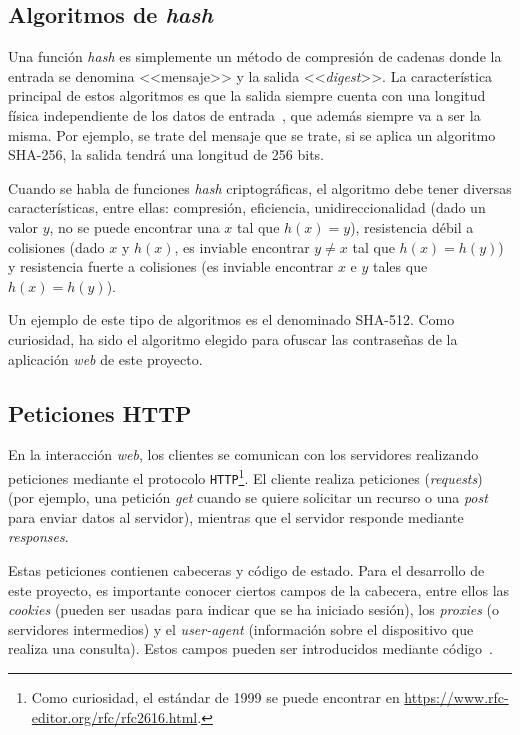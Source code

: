 \subsection{Algoritmos de \textit{hash}}

Una función \textit{hash} es simplemente un método de compresión de cadenas donde la entrada se denomina <<mensaje>> y la salida <<\textit{digest}>>. La característica principal de estos algoritmos es que la salida siempre cuenta con una longitud física independiente de los datos de entrada~\cite{apuntesCybersec}, que además siempre va a ser la misma. Por ejemplo, se trate del mensaje que se trate, si se aplica un algoritmo SHA-256, la salida tendrá una longitud de 256 bits.

Cuando se habla de funciones \textit{hash} criptográficas, el algoritmo debe tener diversas características, entre ellas: compresión, eficiencia, unidireccionalidad (dado un valor $y$, no se puede encontrar una $x$ tal que $h(x)=y$), resistencia débil a colisiones (dado $x$ y $h(x)$, es inviable encontrar $y \ne x$ tal que $h(x)=h(y)$) y resistencia fuerte a colisiones (es inviable encontrar $x$ e $y$ tales que $h(x)=h(y)$).

Un ejemplo de este tipo de algoritmos es el denominado SHA-512. Como curiosidad, ha sido el algoritmo elegido para ofuscar las contraseñas de la aplicación \textit{web} de este proyecto.

\subsection{Peticiones HTTP}

En la interacción \textit{web}, los clientes se comunican con los servidores realizando peticiones mediante el protocolo \texttt{HTTP}\footnote{Como curiosidad, el estándar de 1999 se puede encontrar en \url{https://www.rfc-editor.org/rfc/rfc2616.html}.}. El cliente realiza peticiones (\textit{requests}) (por ejemplo, una petición \textit{get} cuando se quiere solicitar un recurso o una \textit{post} para enviar datos al servidor), mientras que el servidor responde mediante \textit{responses}.

Estas peticiones contienen cabeceras y código de estado. Para el desarrollo de este proyecto, es importante conocer ciertos campos de la cabecera, entre ellos las \textit{cookies} (pueden ser usadas para indicar que se ha iniciado sesión), los \textit{proxies} (o servidores intermedios) y el \textit{user-agent} (información sobre el dispositivo que realiza una consulta). Estos campos pueden ser introducidos mediante código~\cite{httpHeaders}.

